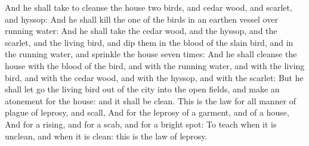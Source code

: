\begin{biblechapter}
\verse And he shall take to cleanse the house two birds, and cedar wood, and scarlet, and hyssop:
\verse And he shall kill the one of the birds in an earthen vessel over running water:
\verse And he shall take the cedar wood, and the hyssop, and the scarlet, and the living bird, and dip them in the blood of the slain bird, and in the running water, and sprinkle the house seven times:
\verse And he shall cleanse the house with the blood of the bird, and with the running water, and with the living bird, and with the cedar wood, and with the hyssop, and with the scarlet:
\verse But he shall let go the living bird out of the city into the open fields, and make an atonement for the house: and it shall be clean.
\verse This is the law for all manner of plague of leprosy, and scall,
\verse And for the leprosy of a garment, and of a house,
\verse And for a rising, and for a scab, and for a bright spot:
\verse To teach when it is unclean, and when it is clean: this is the law of leprosy.
\end{biblechapter}

